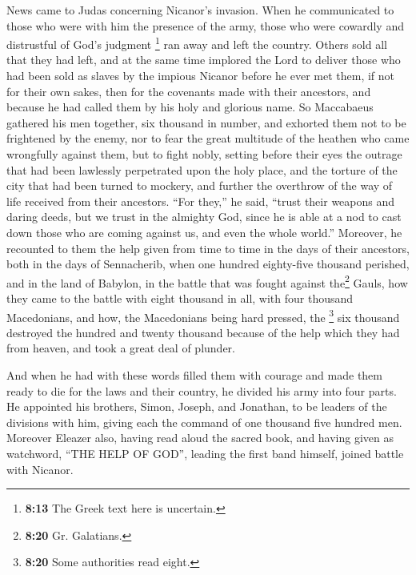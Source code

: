  News came to Judas concerning Nicanor's invasion. When
he communicated to those who were with him the presence of the army,
 those who were cowardly and distrustful of God's
judgment \footnote{\textbf{8:13} The Greek text here is uncertain.} ran
away and left the country.  Others sold all that they had
left, and at the same time implored the Lord to deliver those who had
been sold as slaves by the impious Nicanor before he ever met them,
 if not for their own sakes, then for the covenants made
with their ancestors, and because he had called them by his holy and
glorious name.  So Maccabaeus gathered his men together,
six thousand in number, and exhorted them not to be frightened by the
enemy, nor to fear the great multitude of the heathen who came
wrongfully against them, but to fight nobly,  setting
before their eyes the outrage that had been lawlessly perpetrated upon
the holy place, and the torture of the city that had been turned to
mockery, and further the overthrow of the way of life received from
their ancestors.  ``For they,'' he said, ``trust their
weapons and daring deeds, but we trust in the almighty God, since he is
able at a nod to cast down those who are coming against us, and even the
whole world.''  Moreover, he recounted to them the help
given from time to time in the days of their ancestors, both in the days
of Sennacherib, when one hundred eighty-five thousand perished,
 and in the land of Babylon, in the battle that was
fought against the\footnote{\textbf{8:20} Gr. Galatians.} Gauls, how
they came to the battle with eight thousand in all, with four thousand
Macedonians, and how, the Macedonians being hard pressed, the
\footnote{\textbf{8:20} Some authorities read eight.} six thousand
destroyed the hundred and twenty thousand because of the help which they
had from heaven, and took a great deal of plunder.

 And when he had with these words filled them with
courage and made them ready to die for the laws and their country, he
divided his army into four parts.  He appointed his
brothers, Simon, Joseph, and Jonathan, to be leaders of the divisions
with him, giving each the command of one thousand five hundred men.
 Moreover Eleazer also, having read aloud the sacred
book, and having given as watchword, ``THE HELP OF GOD'', leading the
first band himself, joined battle with Nicanor.

